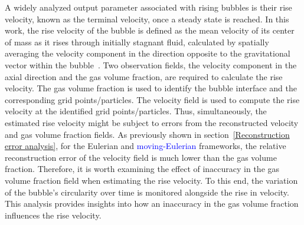 \documentclass[a4paper,fleqn]{cas-sc}
\newcommand{\hl}[1]{\textcolor{blue}{#1}} %
\newcommand{\hl}[1]{#1} %
\begin{document}
	
	A widely analyzed output parameter associated with rising bubbles is their rise velocity, known as the terminal velocity, once a steady state is reached. In this work, the rise velocity of the bubble is defined as the mean velocity of its center of mass as it rises through initially stagnant fluid, calculated by spatially averaging the velocity component in the direction opposite to the gravitational vector within the bubble~\cite{Hysing2009}. Two observation fields, the velocity component in the axial direction and the gas volume fraction, are required to calculate the rise velocity. The gas volume fraction is used to identify the bubble interface and the corresponding grid points/particles. The velocity field is used to compute the rise velocity at the identified grid points/particles. Thus, simultaneously, the estimated rise velocity might be subject to errors from the reconstructed velocity and gas volume fraction fields. As previously shown in section~\ref{Reconstruction error analysis}, for the Eulerian and \hl{moving-Eulerian} frameworks, the relative reconstruction error of the velocity field is much lower than the gas volume fraction. Therefore, it is worth examining the effect of inaccuracy in the gas volume fraction field when estimating the rise velocity. To this end, the variation of the bubble's circularity over time is monitored alongside the rise in velocity. This analysis provides insights into how an inaccuracy in the gas volume fraction influences the rise velocity. 
	
\end{document}
